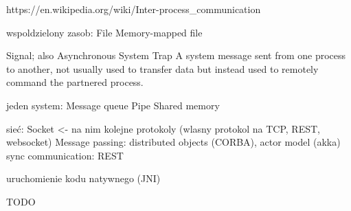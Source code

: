 https://en.wikipedia.org/wiki/Inter-process\_communication

wspoldzielony zasob:
File
Memory-mapped file

Signal; also Asynchronous System Trap	A system message sent from one process to another, not usually used to transfer data but instead used to remotely command the partnered process.




jeden system:
Message queue
Pipe
Shared memory


sieć:
Socket <- na nim kolejne protokoly (wlasny protokol na TCP, REST, websocket)
Message passing: distributed objects (CORBA), actor model (akka)
sync communication: REST


uruchomienie kodu natywnego (JNI)




TODO

